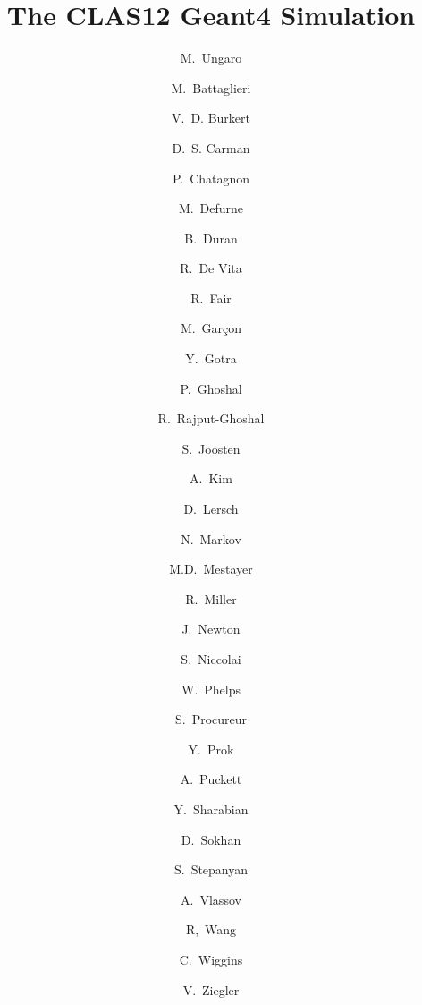 \title{The CLAS12 Geant4 Simulation}



\author[A]{M.~Ungaro}
\author[B]{M.~Battaglieri}
\author[A]{V.~D. Burkert}
\author[A]{D.~S. Carman}
\author[E]{P.~Chatagnon}
\author[C]{M.~Defurne}
\author[K]{B.~Duran}
\author[B]{R.~De Vita}
\author[A]{R.~Fair}
\author[C]{M.~Gar\c con}
\author[A]{Y.~Gotra}
\author[A]{P.~Ghoshal}
\author[A]{R.~Rajput-Ghoshal}
\author[K]{S.~Joosten}
\author[D]{A.~Kim}
\author[J]{D.~Lersch}
\author[D]{N.~Markov}
\author[A]{M.D.~Mestayer}
\author[A]{R.~Miller}
\author[H]{J.~Newton}
\author[E]{S.~Niccolai}
\author[L]{W.~Phelps}
\author[C]{S.~Procureur}
\author[H, I]{Y.~Prok}
\author[D]{A.~Puckett}
\author[A]{Y.~Sharabian}
\author[F]{D.~Sokhan}
\author[A]{S.~Stepanyan}
\author[G]{A.~Vlassov}
\author[E]{R,~Wang}
\author[A]{C.~Wiggins}
\author[A]{V.~Ziegler}

\address[A]{Thomas Jefferson National Accelerator Facility, Newport News, VA 23606, USA}
\address[B]{Istituto Nazionale Di Fisica Nucleare, 16146 Genova, Italy}
\address[C]{IRFU, CEA, Universit\'e Paris-Saclay, F-91191 Gif-sur-Yvette, France}
\address[D]{University of Connecticut, Storrs, Connecticut 06269, USA}
\address[E]{Institut de Physique Nuclaire, CNRS-IN2P3, Univ. Paris-Sud, Universit Paris-Saclay, 91406 Orsay Cedex, France}
\address[F]{University of Glasgow, Glasgow G12 8QQ, United Kingdom}
\address[G]{Institute For Theoretical and Experimental Physics, Ulitsa, 25 Moscow, Russia, 117218}
\address[H]{Old Dominion University, Norfolk, VA 23529, USA}
\address[I]{Virginia Commonwealth University, Richmond, VA 23284, USA}
\address[J]{Florida State University, Tallahassee, FL 32306, USA}
\address[K]{Temple University, Philadelphia, PA 19122, USA}
\address[L]{George Washington University, Washington, DC 20052, USA}
